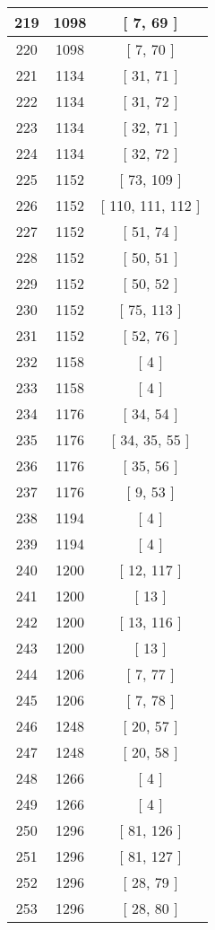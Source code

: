 \begin{center}
\begin{longtable}[H]{|| c c c ||}
\hline
219 & 1098 & [ 7, 69 ] \\ 
\hline
220 & 1098 & [ 7, 70 ] \\ 
\hline
221 & 1134 & [ 31, 71 ] \\ 
\hline
222 & 1134 & [ 31, 72 ] \\ 
\hline
223 & 1134 & [ 32, 71 ] \\ 
\hline
224 & 1134 & [ 32, 72 ] \\ 
\hline
225 & 1152 & [ 73, 109 ] \\ 
\hline
226 & 1152 & [ 110, 111, 112 ] \\ 
\hline
227 & 1152 & [ 51, 74 ] \\ 
\hline
228 & 1152 & [ 50, 51 ] \\ 
\hline
229 & 1152 & [ 50, 52 ] \\ 
\hline
230 & 1152 & [ 75, 113 ] \\ 
\hline
231 & 1152 & [ 52, 76 ] \\ 
\hline
232 & 1158 & [ 4 ] \\ 
\hline
233 & 1158 & [ 4 ] \\ 
\hline
234 & 1176 & [ 34, 54 ] \\ 
\hline
235 & 1176 & [ 34, 35, 55 ] \\ 
\hline
236 & 1176 & [ 35, 56 ] \\ 
\hline
237 & 1176 & [ 9, 53 ] \\ 
\hline
238 & 1194 & [ 4 ] \\ 
\hline
239 & 1194 & [ 4 ] \\ 
\hline
240 & 1200 & [ 12, 117 ] \\ 
\hline
241 & 1200 & [ 13 ] \\ 
\hline
242 & 1200 & [ 13, 116 ] \\ 
\hline
243 & 1200 & [ 13 ] \\ 
\hline
244 & 1206 & [ 7, 77 ] \\ 
\hline
245 & 1206 & [ 7, 78 ] \\ 
\hline
246 & 1248 & [ 20, 57 ] \\ 
\hline
247 & 1248 & [ 20, 58 ] \\ 
\hline
248 & 1266 & [ 4 ] \\ 
\hline
249 & 1266 & [ 4 ] \\ 
\hline
250 & 1296 & [ 81, 126 ] \\ 
\hline
251 & 1296 & [ 81, 127 ] \\ 
\hline
252 & 1296 & [ 28, 79 ] \\ 
\hline
253 & 1296 & [ 28, 80 ] \\ 
\hline

\end{longtable}
\end{center}
